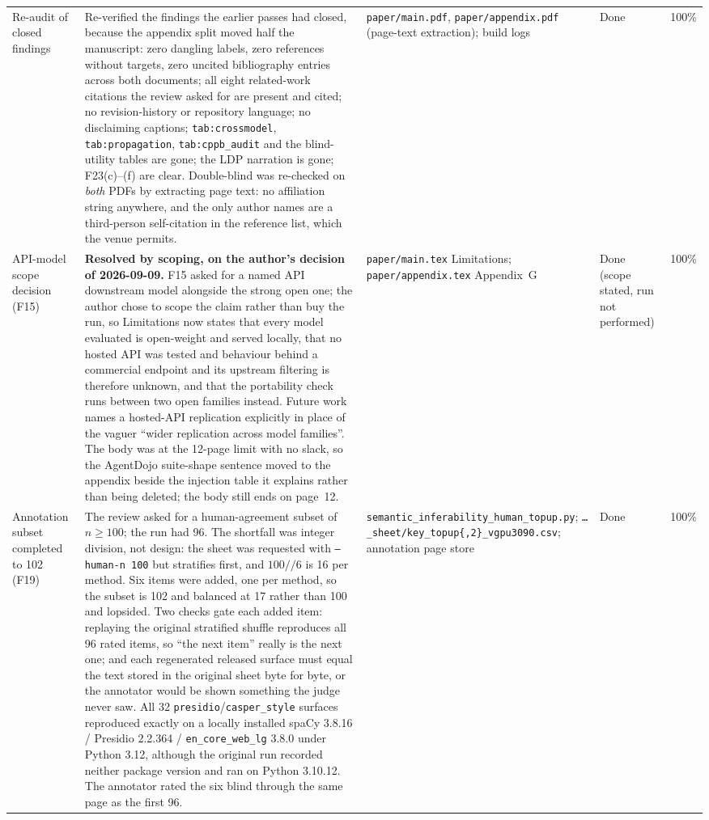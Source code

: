 \documentclass[11pt]{article}
\begin{document}
\begin{longtable}{p{}p{}p{}p{}p{}}
Re-audit of closed findings & Re-verified the findings the earlier passes had closed, because the appendix split moved half the manuscript: zero dangling labels, zero references without targets, zero uncited bibliography entries across both documents; all eight related-work citations the review asked for are present and cited; no revision-history or repository language; no disclaiming captions; \texttt{tab:crossmodel}, \texttt{tab:propagation}, \texttt{tab:cppb\_audit} and the blind-utility tables are gone; the LDP narration is gone; F23(c)--(f) are clear. Double-blind was re-checked on \emph{both} PDFs by extracting page text: no affiliation string anywhere, and the only author names are a third-person self-citation in the reference list, which the venue permits. & \texttt{paper/main.pdf}, \texttt{paper/appendix.pdf} (page-text extraction); build logs & Done & 100\% \\
API-model scope decision (F15) & \textbf{Resolved by scoping, on the author's decision of 2026-09-09.} F15 asked for a named API downstream model alongside the strong open one; the author chose to scope the claim rather than buy the run, so Limitations now states that every model evaluated is open-weight and served locally, that no hosted API was tested and behaviour behind a commercial endpoint and its upstream filtering is therefore unknown, and that the portability check runs between two open families instead. Future work names a hosted-API replication explicitly in place of the vaguer ``wider replication across model families''. The body was at the 12-page limit with no slack, so the AgentDojo suite-shape sentence moved to the appendix beside the injection table it explains rather than being deleted; the body still ends on page~12. & \texttt{paper/main.tex} Limitations; \texttt{paper/appendix.tex} Appendix~G & Done (scope stated, run not performed) & 100\% \\
Annotation subset completed to 102 (F19) & The review asked for a human-agreement subset of $n\ge100$; the run had 96. The shortfall was integer division, not design: the sheet was requested with \texttt{--human-n 100} but stratifies first, and $100//6$ is 16 per method. Six items were added, one per method, so the subset is 102 and balanced at 17 rather than 100 and lopsided. Two checks gate each added item: replaying the original stratified shuffle reproduces all 96 rated items, so ``the next item'' really is the next one; and each regenerated released surface must equal the text stored in the original sheet byte for byte, or the annotator would be shown something the judge never saw. All 32 \texttt{presidio}/\texttt{casper\_style} surfaces reproduced exactly on a locally installed spaCy 3.8.16 / Presidio 2.2.364 / \texttt{en\_core\_web\_lg} 3.8.0 under Python 3.12, although the original run recorded neither package version and ran on Python 3.10.12. The annotator rated the six blind through the same page as the first 96. & \texttt{semantic\_inferability\_human\_topup.py}; \texttt{\ldots\_sheet/key\_topup\{,2\}\_vgpu3090.csv}; annotation page store & Done & 100\% \\

\end{longtable}
\end{document}
